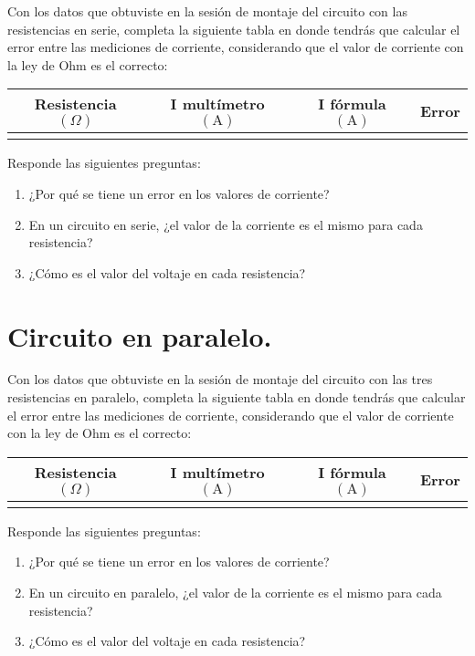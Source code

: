 \documentclass[14pt]{extarticle}
\begin{document}
Con los datos que obtuviste en la sesión de montaje del circuito con las resistencias en serie, completa la siguiente tabla en donde tendrás que calcular el error entre las mediciones de corriente, considerando que el valor de corriente con la ley de Ohm es el correcto:
\begin{table}[H]
\centering
\begin{tabular}{| c | c | c | >{\centering\arraybackslash}p{3cm} | } \hline
Resistencia $(\Omega)$ & I multímetro $(\si{\ampere})$ & I fórmula $(\si{\ampere})$ & Error \\ \hline
 & & & \\ \hline
\end{tabular}
\end{table}

Responde las siguientes preguntas:
\begin{enumerate}
\item ¿Por qué se tiene un error en los valores de corriente?
\item En un circuito en serie, ¿el valor de la corriente es el mismo para cada resistencia?
\item ¿Cómo es el valor del voltaje en cada resistencia?
\end{enumerate}

\section{Circuito en paralelo.}

Con los datos que obtuviste en la sesión de montaje del circuito con las tres resistencias en paralelo, completa la siguiente tabla en donde tendrás que calcular el error entre las mediciones de corriente, considerando que el valor de corriente con la ley de Ohm es el correcto:
\begin{table}[H]
\centering
\begin{tabular}{| c | c | c | >{\centering\arraybackslash}p{3cm} | } \hline
Resistencia $(\Omega)$ & I multímetro $(\si{\ampere})$ & I fórmula $(\si{\ampere})$ & Error \\ \hline
 & & & \\ \hline
\end{tabular}
\end{table}

Responde las siguientes preguntas:
\begin{enumerate}
\item ¿Por qué se tiene un error en los valores de corriente?
\item En un circuito en paralelo, ¿el valor de la corriente es el mismo para cada resistencia?
\item ¿Cómo es el valor del voltaje en cada resistencia?
\end{enumerate}
\end{document}
